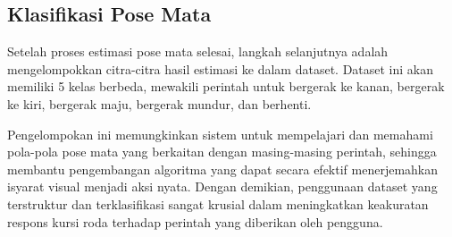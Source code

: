 \subsection{Klasifikasi Pose Mata}
Setelah proses estimasi pose mata selesai, langkah selanjutnya adalah mengelompokkan citra-citra hasil estimasi ke dalam dataset. Dataset ini akan memiliki 5 kelas berbeda, mewakili perintah untuk bergerak ke kanan, bergerak ke kiri, bergerak maju, bergerak mundur, dan berhenti. 

Pengelompokan ini memungkinkan sistem untuk mempelajari dan memahami pola-pola pose mata yang berkaitan dengan masing-masing perintah, sehingga membantu pengembangan algoritma yang dapat secara efektif menerjemahkan isyarat visual menjadi aksi nyata. Dengan demikian, penggunaan dataset yang terstruktur dan terklasifikasi sangat krusial dalam meningkatkan keakuratan respons kursi roda terhadap perintah yang diberikan oleh pengguna.

